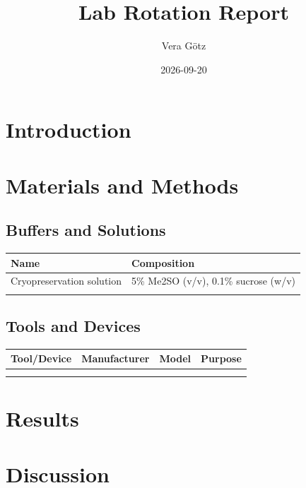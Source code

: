 \documentclass[
]{article}
\title{Lab Rotation Report}
\author{Vera Götz}
\date{2026-09-20}
\begin{document}
\maketitle

{
\setcounter{tocdepth}{2}
\tableofcontents
}
\section{Introduction}\label{introduction}

\section{Materials and Methods}\label{materials-and-methods}

\subsection{Buffers and Solutions}\label{buffers-and-solutions}

\begin{longtable}[]{@{}ll@{}}
\toprule\noalign{}
Name & Composition \\
\midrule\noalign{}
\endhead
\bottomrule\noalign{}
\endlastfoot
Cryopreservation solution & 5\% Me2SO (v/v), 0.1\% sucrose (w/v) \\
& \\
\end{longtable}

\subsection{Tools and Devices}\label{tools-and-devices}

\begin{longtable}[]{@{}llll@{}}
\toprule\noalign{}
Tool/Device & Manufacturer & Model & Purpose \\
\midrule\noalign{}
\endhead
\bottomrule\noalign{}
\endlastfoot
& & & \\
& & & \\
\end{longtable}

\section{Results}\label{results}

\section{Discussion}\label{discussion}
\end{document}
